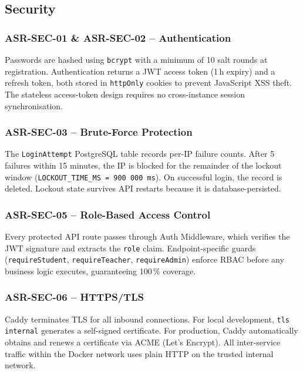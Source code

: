\documentclass[12pt,a4paper]{article}
\begin{document}
\subsection{Security}

\subsubsection{ASR-SEC-01 \& ASR-SEC-02 -- Authentication}

Passwords are hashed using \texttt{bcrypt} with a minimum of 10 salt rounds at registration. Authentication returns a JWT access token (1\,h expiry) and a refresh token, both stored in \texttt{httpOnly} cookies to prevent JavaScript XSS theft. The stateless access-token design requires no cross-instance session synchronisation.

\subsubsection{ASR-SEC-03 -- Brute-Force Protection}

The \texttt{LoginAttempt} PostgreSQL table records per-IP failure counts. After 5 failures within 15 minutes, the IP is blocked for the remainder of the lockout window (\texttt{LOCKOUT\_TIME\_MS = 900\,000\,ms}). On successful login, the record is deleted. Lockout state survives API restarts because it is database-persisted.

\subsubsection{ASR-SEC-05 -- Role-Based Access Control}

Every protected API route passes through Auth Middleware, which verifies the JWT signature and extracts the \texttt{role} claim. Endpoint-specific guards (\texttt{requireStudent}, \texttt{requireTeacher}, \texttt{requireAdmin}) enforce RBAC before any business logic executes, guaranteeing 100\,\% coverage.

\subsubsection{ASR-SEC-06 -- HTTPS/TLS}

Caddy terminates TLS for all inbound connections. For local development, \texttt{tls internal} generates a self-signed certificate. For production, Caddy automatically obtains and renews a certificate via ACME (Let's Encrypt). All inter-service traffic within the Docker network uses plain HTTP on the trusted internal network.
\end{document}
